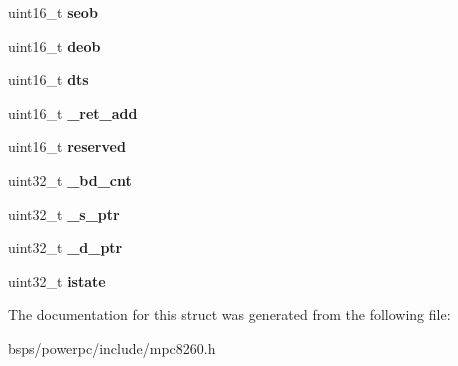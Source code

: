 \begin{DoxyCompactItemize}
\item 
\mbox{\label{structm8260IDMAparms___accbe0486696c1a249f153a1ee35ea4c4}} 
uint16\+\_\+t {\bfseries seob}
\item 
\mbox{\label{structm8260IDMAparms___ab5c6b63730deb65b017ffa946d70d52d}} 
uint16\+\_\+t {\bfseries deob}
\item 
\mbox{\label{structm8260IDMAparms___a00d1cd4c29dd21d107a80bbdc65e7e4a}} 
uint16\+\_\+t {\bfseries dts}
\item 
\mbox{\label{structm8260IDMAparms___a640485b2d8c0e6126159f553f9d9b8cd}} 
uint16\+\_\+t {\bfseries \+\_\+ret\+\_\+add}
\item 
\mbox{\label{structm8260IDMAparms___a4506a2f8c5e4a24647f5d1c1f3dc5e72}} 
uint16\+\_\+t {\bfseries reserved}
\item 
\mbox{\label{structm8260IDMAparms___a5e9c178995c56425bffae6869eea61f2}} 
uint32\+\_\+t {\bfseries \+\_\+bd\+\_\+cnt}
\item 
\mbox{\label{structm8260IDMAparms___ac926517b66ca740d5915fc243ee8ac0f}} 
uint32\+\_\+t {\bfseries \+\_\+s\+\_\+ptr}
\item 
\mbox{\label{structm8260IDMAparms___ac764c22e860d958f37c877c4936c4488}} 
uint32\+\_\+t {\bfseries \+\_\+d\+\_\+ptr}
\item 
\mbox{\label{structm8260IDMAparms___aaf57d111263aaa40b2e3fbf1ffedcd59}} 
uint32\+\_\+t {\bfseries istate}
\end{DoxyCompactItemize}


The documentation for this struct was generated from the following file\+:\begin{DoxyCompactItemize}
\item 
bsps/powerpc/include/mpc8260.\+h\end{DoxyCompactItemize}
